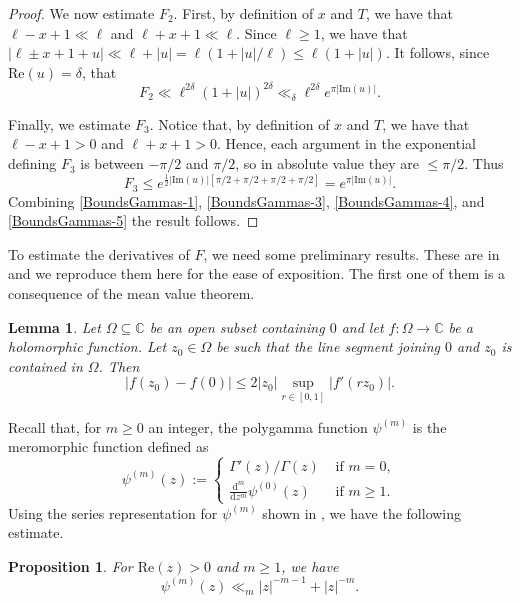 \documentclass[11pt]{amsart}
\newcommand{\C}{\mathbb{C}}
\newtheorem{proposition}[theorem]{Proposition}
\newtheorem{lemma}[theorem]{Lemma}
\theoremstyle{definition}
\theoremstyle{remark}
\begin{document}
\begin{proof}
We now estimate $F_2$. First, by definition of $x$ and $T$, we have that $\ell-x+1\ll \ell$ and $\ell+x+1 \ll \ell$. Since $\ell\geq 1$, we have that $ |\ell\pm x+1+u| \ll \ell+|u| = \ell(1+|u|/\ell) \leq \ell(1+|u|)$. It follows, since $\mathrm{Re}(u)=\delta$, that 
\begin{equation}
    F_2 \ll \ell^{2\delta} (1+|u|)^{2\delta} \ll_{\delta} \ell^{2\delta} e^{\pi |\mathrm{Im}(u)|}. \label{BoundsGammas-4}
\end{equation}

Finally, we estimate $F_3$. Notice that, by definition of $x$ and $T$, we have that $\ell-x+1>0$ and $\ell+x+1 >0$. Hence, each argument in the exponential defining $F_3$ is between $-\pi/2$ and $\pi/2$, so in absolute value they are $\leq \pi/2$. Thus
\begin{equation}
    F_3 \leq e^{\frac{1}{2}|\mathrm{Im}(u)| \left[ \pi/2 + \pi/2 + \pi/2 + \pi/2\right]} = e^{\pi|\mathrm{Im}(u)|}. \label{BoundsGammas-5}
\end{equation}
Combining \eqref{BoundsGammas-1}, \eqref{BoundsGammas-3}, \eqref{BoundsGammas-4}, and \eqref{BoundsGammas-5} the result follows.
\end{proof}

To estimate the derivatives of $F$, we need some preliminary results. These are in \cite[\S 3.2.1]{DanaMScThesis} and we reproduce them here for the ease of exposition. The first one of them is a consequence of the mean value theorem.

\begin{lemma}\label{MVTComplex}
Let $\Omega \subseteq \C$ be an open subset containing $0$ and let $f:\Omega \rightarrow \C$ be a holomorphic function. Let $z_0 \in \Omega$ be such that the line segment joining $0$ and $z_0$ is contained in $\Omega$. Then $$ |f(z_0) - f(0)| \leq 2|z_0| \sup_{r\in [0,1]} |f'(rz_0)|.$$
\end{lemma}

Recall that, for $m\geq 0$ an integer, the polygamma function $\psi^{(m)}$ is the meromorphic function defined as $$ \psi^{(m)}(z) := \left\{ \begin{array}{ll}
    \Gamma'(z)/\Gamma(z) & \text{ if } m=0, \\
    \frac{\mathrm{d}^m}{\mathrm{d}z^m} \psi^{(0)}(z) & \text{ if } m\geq 1.
\end{array} \right.$$ Using the series representation for $\psi^{(m)}$ shown in \cite[6.4.10]{TableFormulas}, we have the following estimate.

\begin{proposition}\label{PolygammaEstimates}
For $\mathrm{Re}(z)>0$ and $m\geq 1$, we have $$ \psi^{(m)}(z) \ll_{m} |z|^{-m-1} + |z|^{-m}.$$
\end{proposition}
\end{document}
